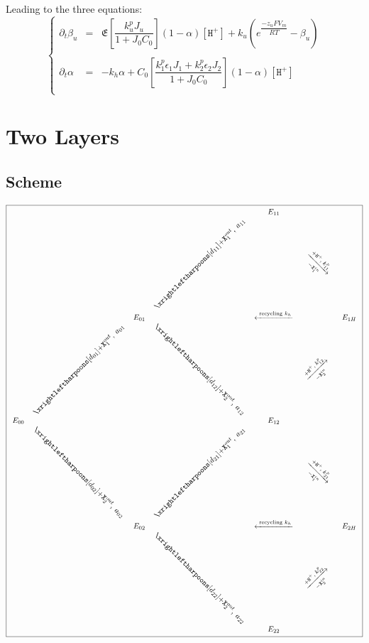 \documentclass[aps,onecolumn,12pt]{revtex4}
\newcommand{\mychem}[1]{\mathtt{#1}}
\newcommand{\myconc}[1]{\left[#1\right]}
\newcommand{\spx}{\mychem{X}}
\newcommand{\spproton}{\mychem{H^+}}
\newcommand{\proton}{\myconc{\spproton}}
\newcommand{\myrotate}[2]{\rotatebox[origin=c]{#1}{#2}}
\begin{document}
Leading to the three equations:
\begin{equation}
\left\lbrace
\begin{array}{rcl}
	\partial_t \beta_u & = & \mathfrak{E} \left[\dfrac{k^p_u J_u}{1+J_0 C_0}\right] \left(1-\alpha\right) \proton
	 + k_u \left( e^{\dfrac{-z_u F V_m }{RT}}- \beta_u\right)\\
	\\
	\partial_t \alpha  & = &  -k_h\alpha + C_0 \left[\dfrac{k^p_1 \epsilon_1 J_1  + k^p_2 \epsilon_2 J_2   }{1+J_0C_0}\right] \left(1-\alpha\right) \proton\\
\end{array}
\right.
\end{equation}

\section{Two Layers}
\subsection{Scheme}

\begin{equation}
\boxed{
\begin{array}{ccccccc}
 & &        &                                                  & E_{11} & & \\
 & &        & \myrotate{45}{$\xrightleftharpoons[d_{11}]{+\spx_1^{out},\;a_{11}}$} & &  \myrotate{-45}{$\xrightarrow[-\spx_1^{in}]{+ \spproton, \; k^p_{11}}$}& \\
 & & E_{01} &  & \xleftarrow{\text{ recycling } k_h } & & E_{1H}\\
 &  \rotatebox[origin=c]{45}{$\xrightleftharpoons[d_{01}]{+\spx_1^{out},\;a_{01}}$} &   & \myrotate{-45}{$\xrightleftharpoons[d_{12}]{+\spx_2^{out},\;a_{12}}$} & & \rotatebox[origin=c]{45}{$\xrightarrow[-\spx_2^{in}]{+ \spproton, \; k^p_{12}}$}&\\
E_{00} & &  & & E_{12} & & \\ 
  & \myrotate{-45}{$\xrightleftharpoons[d_{02}]{+\spx_2^{out},\;a_{02}}$} &  & \myrotate{45}{$\xrightleftharpoons[d_{21}]{+\spx_1^{out},\;a_{21}}$} & & \myrotate{-45}{$\xrightarrow[-\spx_1^{in}]{+ \spproton, \; k^p_{21}}$} & \\
  & & E_{02} &   & \xleftarrow{\text{ recycling } k_h } & & E_{2H}\\
  & &  & \myrotate{-45}{$\xrightleftharpoons[d_{22}]{+\spx_2^{out},\;a_{22}}$} & & \myrotate{45}{$\xrightarrow[-\spx_2^{in}]{+ \spproton, \; k^p_{22}}$} &\\
  & &  &  & E_{22} & &\\

 \end{array}
 }
\end{equation}
\end{document}
